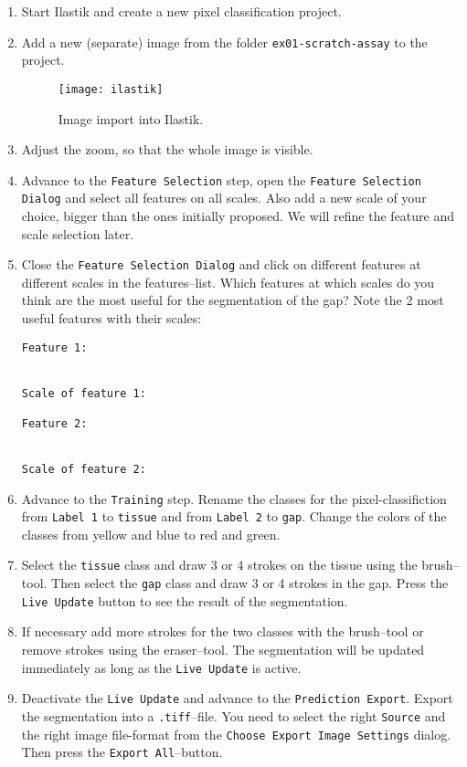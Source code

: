 \begin{enumerate}
\item Start Ilastik and create a new pixel classification project.
\item Add a new (separate) image from the folder {\tt ex01-scratch-assay} to the project.
\begin{figure}[!htb]
 \centering
 \texttt{[image: ilastik]}
 \caption{Image import into Ilastik.}
 \label{figure:ilastik}
\end{figure}
\item Adjust the zoom, so that the whole image is visible.
\item Advance to the {\tt Feature Selection} step, open the {\tt Feature Selection Dialog} and select all features on all scales. Also add a new scale of your choice, bigger than the ones initially proposed. We will refine the feature and scale selection later.
\item Close the {\tt Feature Selection Dialog} and click on different features at different scales in the features--list. Which features at which scales do you think are the most useful for the segmentation of the gap? Note the 2 most useful features with their scales:
\begin{verbatim}
Feature 1:


Scale of feature 1:

Feature 2:


Scale of feature 2:

\end{verbatim} 
\item Advance to the {\tt Training} step. Rename the classes for the pixel-classifiction from {\tt Label 1} to {\tt tissue} and from {\tt Label 2} to {\tt gap}. Change the colors of the classes from yellow and blue to red and green.

\item Select the {\tt tissue} class and draw 3 or 4 strokes on the tissue using the brush--tool. Then select the {\tt gap} class and draw 3 or 4 strokes in the gap. Press the {\tt Live Update} button to see the result of the segmentation.

\item If necessary add more strokes for the two classes with the brush--tool or remove strokes using the eraser--tool. The segmentation will be updated immediately as long as the {\tt Live Update} is active.

\item Deactivate the {\tt Live Update} and advance to the {\tt Prediction Export}. Export the segmentation into a {\tt .tiff}--file. You need to select the right {\tt Source} and the right image file-format from the {\tt Choose Export Image Settings} dialog. Then press the {\tt Export All}--button.


\end{enumerate}
